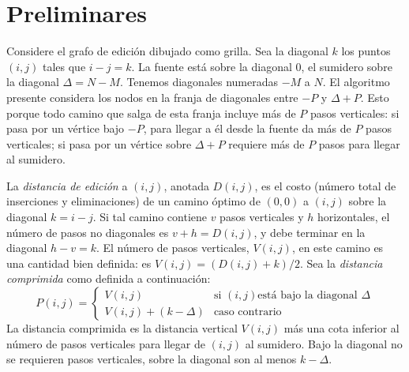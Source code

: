 \section{Preliminares}
\label{sec:LCS-WMMM:preliminares}

  Considere el grafo de edición dibujado como grilla.
  Sea la diagonal \(k\)
  los puntos \((i, j)\) tales que \(i - j = k\).
  La fuente está sobre la diagonal \num{0},
  el sumidero sobre la diagonal \(\Delta = N - M\).
  Tenemos diagonales numeradas \(-M\) a \(N\).
  El algoritmo presente considera los nodos en la franja de diagonales
  entre \(-P\) y \(\Delta + P\).
  Esto porque todo camino que salga de esta franja
  incluye más de \(P\) pasos verticales:
  si pasa por un vértice bajo \(-P\),
  para llegar a él desde la fuente da más de \(P\) pasos verticales;
  si pasa por un vértice sobre \(\Delta + P\)
  requiere más de \(P\) pasos para llegar al sumidero.

  La \emph{distancia de edición} a \((i, j)\),
  anotada \(D(i, j)\),
  es el costo
  (número total de inserciones y eliminaciones)
  de un camino óptimo de \((0, 0)\) a \((i, j)\)
  sobre la diagonal \(k = i - j\).
  Si tal camino contiene \(v\) pasos verticales y \(h\) horizontales,
  el número de pasos no diagonales es \(v + h = D(i, j)\),
  y debe terminar en la diagonal \(h - v = k\).
  El número de pasos verticales,
  \(V(i, j)\),
  en este camino es una cantidad bien definida:
  es \(V(i, j) = (D(i, j) + k) / 2\).
  Sea la \emph{distancia comprimida} como definida a continuación:
  \begin{equation}
    \label{eq:LCS-WMMM-P}
    P(i, j)
      = \begin{cases}
          V(i, j)		 & \text{si \((i, j)\)
                                         está bajo la diagonal \(\Delta\)} \\
          V(i, j) + (k - \Delta) & \text{caso contrario}
        \end{cases}
  \end{equation}
  La distancia comprimida
  es la distancia vertical \(V(i, j)\) más una cota inferior
  al número de pasos verticales para llegar de \((i, j)\) al sumidero.
  Bajo la diagonal no se requieren pasos verticales,
  sobre la diagonal son al menos \(k - \Delta\).

